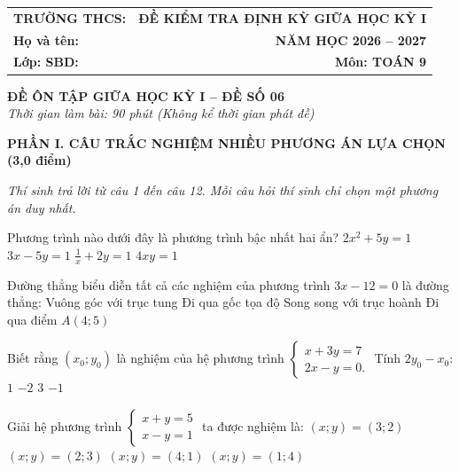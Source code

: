 \documentclass[12pt,a4paper]{article}
\begin{document}
\noindent
\begin{tabularx}{\linewidth}{X r}
\textbf{TRƯỜNG THCS: \dotfill} & \textbf{ĐỀ KIỂM TRA ĐỊNH KỲ GIỮA HỌC KỲ I} \\
\textbf{Họ và tên: \dotfill} & \textbf{NĂM HỌC 2026 -- 2027} \\
\textbf{Lớp: \dotfill \quad SBD: \dotfill} & \textbf{Môn: TOÁN 9} \\
\hline
\end{tabularx}
\vspace{2mm}

\begin{center}
  \textbf{\large ĐỀ ÔN TẬP GIỮA HỌC KỲ I -- ĐỀ SỐ 06}\\
  \textit{Thời gian làm bài: 90 phút (Không kể thời gian phát đề)}
\end{center}
\vspace{1mm}

\noindent\textbf{\large PHẦN I. CÂU TRẮC NGHIỆM NHIỀU PHƯƠNG ÁN LỰA CHỌN (3,0 điểm)}

\textit{Thí sinh trả lời từ câu 1 đến câu 12. Mỗi câu hỏi thí sinh chỉ chọn một phương án duy nhất.}

\vspace{1mm}
\begin{ex}
Phương trình nào dưới đây là phương trình bậc nhất hai ẩn?
\choice
{$2x^2 + 5y = 1$}
{\True $3x - 5y = 1$}
{$\frac{1}{x} + 2y = 1$}
{$4xy = 1$}
\end{ex}

\begin{ex}
Đường thẳng biểu diễn tất cả các nghiệm của phương trình $3x - 12 = 0$ là đường thẳng:
\choice
{Vuông góc với trục tung}
{Đi qua gốc tọa độ}
{Song song với trục hoành}
{\True Đi qua điểm $A(4; 5)$}
\end{ex}

\begin{ex}
Biết rằng $(x_0; y_0)$ là nghiệm của hệ phương trình $\begin{cases} x + 3y = 7 \\ 2x - y = 0. \end{cases}$ Tính $2y_0 - x_0$:
\choice
{$1$}
{$-2$}
{\True $3$}
{$-1$}
\end{ex}

\begin{ex}
Giải hệ phương trình $\begin{cases} x + y = 5 \\ x - y = 1 \end{cases}$ ta được nghiệm là:
\choice
{\True $(x; y) = (3; 2)$}
{$(x; y) = (2; 3)$}
{$(x; y) = (4; 1)$}
{$(x; y) = (1; 4)$}
\end{ex}
\end{document}
